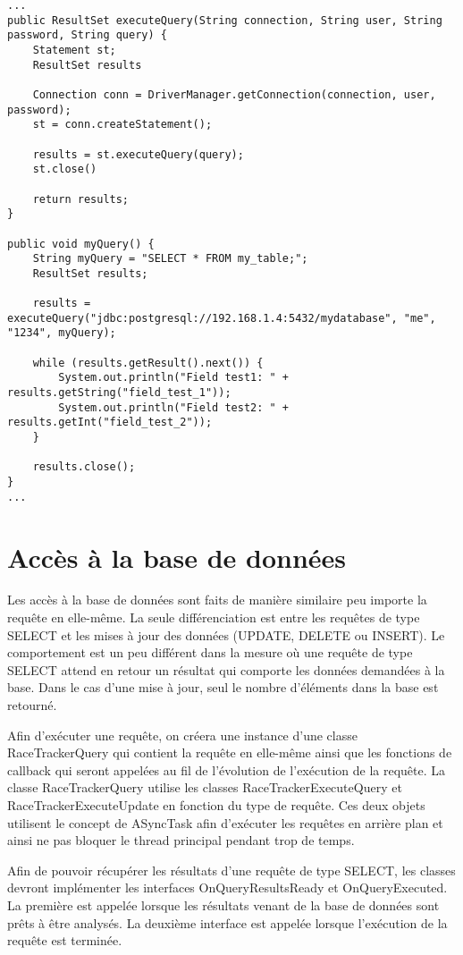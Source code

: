\begin{lstlisting}[style=JavaStyle]
...
public ResultSet executeQuery(String connection, String user, String password, String query) {
	Statement st;
	ResultSet results

	Connection conn = DriverManager.getConnection(connection, user, password);
	st = conn.createStatement();
	
	results = st.executeQuery(query);
	st.close()	
	
	return results;
}

public void myQuery() {
	String myQuery = "SELECT * FROM my_table;";
	ResultSet results;
	
	results = executeQuery("jdbc:postgresql://192.168.1.4:5432/mydatabase", "me", "1234", myQuery);
	
	while (results.getResult().next()) {
		System.out.println("Field test1: " + results.getString("field_test_1"));
		System.out.println("Field test2: " + results.getInt("field_test_2"));
	}
	
	results.close();	
}
...
\end{lstlisting}

\section{Accès à la base de données}

Les accès à la base de données sont faits de manière similaire peu importe la requête en elle-même. La seule différenciation est entre les requêtes de type SELECT et les mises à jour des données (UPDATE, DELETE ou INSERT). Le comportement est un peu différent dans la mesure où une requête de type SELECT attend en retour un résultat qui comporte les données demandées à la base. Dans le cas d'une mise à jour, seul le nombre d'éléments dans la base est retourné.

Afin d'exécuter une requête, on créera une instance d'une classe RaceTrackerQuery qui contient la requête en elle-même ainsi que les fonctions de callback qui seront appelées au fil de l'évolution de l'exécution de la requête. La classe RaceTrackerQuery utilise les classes RaceTrackerExecuteQuery et RaceTrackerExecuteUpdate en fonction du type de requête. Ces deux objets utilisent le concept de ASyncTask afin d'exécuter les requêtes en arrière plan et ainsi ne pas bloquer le thread principal pendant trop de temps.

Afin de pouvoir récupérer les résultats d'une requête de type SELECT, les classes devront implémenter les interfaces OnQueryResultsReady et OnQueryExecuted. La première est appelée lorsque les résultats venant de la base de données sont prêts à être analysés. La deuxième interface est appelée lorsque l'exécution de la requête est terminée.

